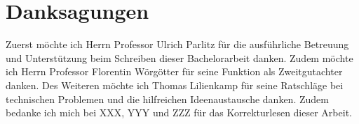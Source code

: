 \chapter{Danksagungen}
Zuerst möchte ich Herrn Professor Ulrich Parlitz für die ausführliche Betreuung und Unterstützung beim Schreiben dieser Bachelorarbeit danken. Zudem möchte ich Herrn Professor Florentin Wörgötter für seine Funktion als Zweitgutachter danken. Des Weiteren möchte ich Thomas Lilienkamp für seine Ratschläge bei technischen Problemen und die hilfreichen Ideenaustausche danken. Zudem bedanke ich mich bei XXX, YYY und ZZZ für das Korrekturlesen dieser Arbeit. 
